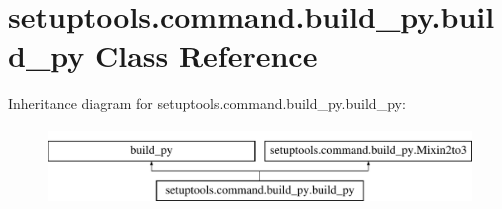 \hypertarget{classsetuptools_1_1command_1_1build__py_1_1build__py}{}\section{setuptools.\+command.\+build\+\_\+py.\+build\+\_\+py Class Reference}
\label{classsetuptools_1_1command_1_1build__py_1_1build__py}
Inheritance diagram for setuptools.\+command.\+build\+\_\+py.\+build\+\_\+py\+:\begin{figure}[H]
\begin{center}
\leavevmode
\includegraphics[height=2.000000cm]{classsetuptools_1_1command_1_1build__py_1_1build__py}
\end{center}
\end{figure}
